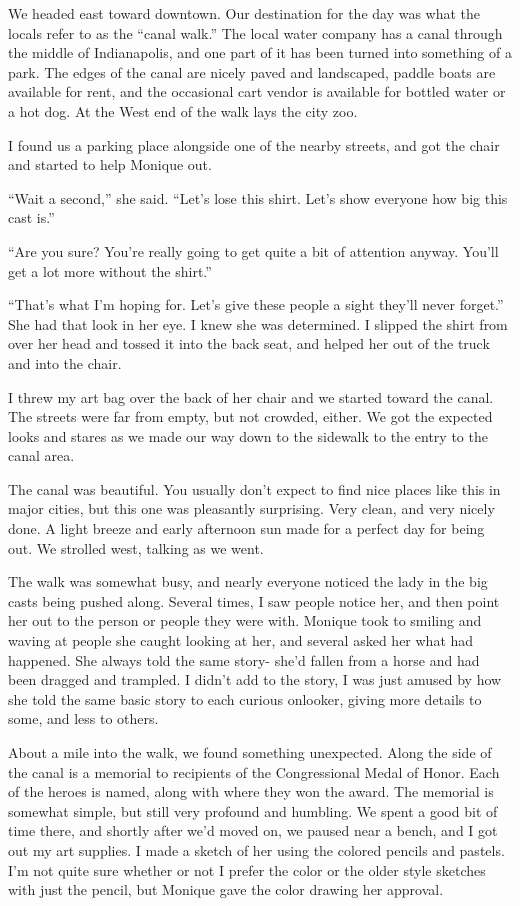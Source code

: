 We headed east toward downtown. Our destination for the day was what the locals refer to as
the ``canal walk.'' The local water company has a canal through the middle of Indianapolis, and
one part of it has been turned into something of a park. The edges of the canal are nicely paved
and landscaped, paddle boats are available for rent, and the occasional cart vendor is available
for bottled water or a hot dog. At the West end of the walk lays the city zoo.

I found us a parking place alongside one of the nearby streets, and got the chair and
started to help Monique out.

``Wait a second,'' she said. ``Let's lose this shirt. Let's show everyone how big this cast
is.''

``Are you sure? You're really going to get quite a bit of attention anyway. You'll get a lot
more without the shirt.''

``That's what I'm hoping for. Let's give these people a sight they'll never forget.'' She had
that look in her eye. I knew she was determined. I slipped the shirt from over her head and
tossed it into the back seat, and helped her out of the truck and into the chair.

I threw my art bag over the back of her chair and we started toward the canal. The streets
were far from empty, but not crowded, either. We got the expected looks and stares as we made
our way down to the sidewalk to the entry to the canal area.

The canal was beautiful. You usually don't expect to find nice places like this in major
cities, but this one was pleasantly surprising. Very clean, and very nicely done. A light breeze
and early afternoon sun made for a perfect day for being out. We strolled west, talking as we
went.

The walk was somewhat busy, and nearly everyone noticed the lady in the big casts being
pushed along. Several times, I saw people notice her, and then point her out to the person or
people they were with. Monique took to smiling and waving at people she caught looking at her,
and several asked her what had happened. She always told the same story- she'd fallen from a
horse and had been dragged and trampled. I didn't add to the story, I was just amused by how she
told the same basic story to each curious onlooker, giving more details to some, and less to
others.

About a mile into the walk, we found something unexpected. Along the side of the canal is a
memorial to recipients of the Congressional Medal of Honor. Each of the heroes is named, along
with where they won the award. The memorial is somewhat simple, but still very profound and
humbling. We spent a good bit of time there, and shortly after we'd moved on, we paused near a
bench, and I got out my art supplies. I made a sketch of her using the colored pencils and
pastels. I'm not quite sure whether or not I prefer the color or the older style sketches with
just the pencil, but Monique gave the color drawing her approval.

